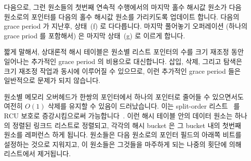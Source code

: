 다음으로, 그런 원소들의 첫번째 연속적 수행에서의 마지막 홀수 해시값 원소가 다음
원소로의 포인터를 다음의 홀수 해시값 원소를 가리키도록 업데이트 합니다.
다음의 grace period 가 지난후, 상태~(f) 로 다다릅니다.
마지막 풀어놓기 오퍼레이션 (하나의 grace priod 를 포함해서) 은 마지막 상태~(g)
로 이르게 합니다.

짧게 말해서, 상대론적 해시 테이블은 원소별 리스트 포인터의 수를 크기 재조정
동안 일어나는 추가적인 grace period 의 비용으로 대신합니다.
삽입, 삭제, 그리고 탐색은 크기 재조정 작업과 동시에 이루어질 수 있으므로, 이런
추가적인 grace period 들은 일반적으로 문제가 되지 않습니다.

원소별 메모리 오버헤드가 한쌍의 포인터에서 하나의 포인터로 줄어들 수 있으면서도
여전히 $O(1)$ 삭제를 유지할 수 있음이 드러났습니다.
이는 split-order 리스트~\cite{OriShalev2006SplitOrderListHash} 를 RCU 보호로
증강시킴으로써
가능합니다~\cite{MathieuDesnoyers2009URCU,PaulMcKenney2013LWNURCUhash}.
이런 해시 테이블 안의 데이터 원소는 하나의 정렬된 링크드 리스트로 정렬되고,
각각의 해시 bucket 은 그 bucket 내의 첫번째 원소를 레퍼런스 하게 됩니다.
원소들은 다음 원소로의 포인터 필드의 아래쪽 비트를 설정하는 것으로 지워지고, 이
원소들은 그것들을 마주하게 되는 나중의 횟단에 의해 리스트에서 제거됩니다.

